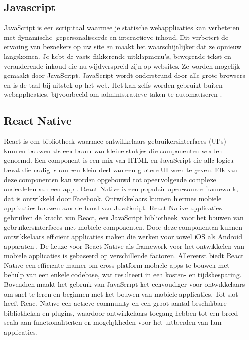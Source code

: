 \subsection{Javascript}
\label{sec:javascript}

JavaScript is een scripttaal waarmee je statische webapplicaties kan verbeteren met dynamische, gepersonaliseerde en interactieve inhoud. Dit verbetert de ervaring van bezoekers op uw site en maakt het waarschijnlijker dat ze opnieuw langskomen. Je hebt de vaste flikkerende uitklapmenu's, bewegende tekst en veranderende inhoud die nu wijdverspreid zijn op websites. Ze worden mogelijk gemaakt door JavaScript. JavaScript wordt ondersteund door alle grote browsers en is de taal bij uitstek op het web. Het kan zelfs worden gebruikt buiten webapplicaties, bijvoorbeeld om administratieve taken te automatiseren \autocite{Wilton2004}.

\subsection{React Native}
\label{sec:react native}

React is een bibliotheek waarmee ontwikkelaars gebruikersinterfaces (UI's) kunnen bouwen als een boom van kleine stukjes die componenten worden genoemd. Een component is een mix van HTML en JavaScript die alle logica bevat die nodig is om een klein deel van een grotere UI weer te geven. Elk van deze componenten kan worden opgebouwd tot opeenvolgende complexe onderdelen van een app \autocite{Baer2018}. React Native is een populair open-source framework, dat is ontwikkeld door Facebook. Ontwikkelaars kunnen hiermee mobiele applicaties bouwen aan de hand van JavaScript. React Native applicaties gebruiken de kracht van React, een JavaScript bibliotheek, voor het bouwen van gebruikersinterfaces met mobiele componenten. Door deze componenten kunnen ontwikkelaars efficiënt applicaties maken die werken voor zowel iOS als Android apparaten \autocite{Vinnik2021}. De keuze voor React Native als framework voor het ontwikkelen van mobiele applicaties is gebaseerd op verschillende factoren. Allereerst biedt React Native een efficiënte manier om cross-platform mobiele apps te bouwen met behulp van een enkele codebase, wat resulteert in een kosten- en tijdsbesparing. Bovendien maakt het gebruik van JavaScript het eenvoudiger voor ontwikkelaars om snel te leren en beginnen met het bouwen van mobiele applicaties. Tot slot heeft React Native een actieve community en een groot aantal beschikbare bibliotheken en plugins, waardoor ontwikkelaars toegang hebben tot een breed scala aan functionaliteiten en mogelijkheden voor het uitbreiden van hun applicaties.
